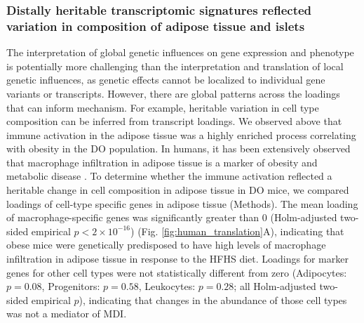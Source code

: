 \documentclass[
]{article}
\begin{document}
\subsubsection{Distally heritable transcriptomic signatures reflected
variation in composition of adipose tissue and
islets}\label{distally-heritable-transcriptomic-signatures-reflected-variation-in-composition-of-adipose-tissue-and-islets}

The interpretation of global genetic influences on gene expression and
phenotype is potentially more challenging than the interpretation and
translation of local genetic influences, as genetic effects cannot be
localized to individual gene variants or transcripts. However, there are
global patterns across the loadings that can inform mechanism. For
example, heritable variation in cell type composition can be inferred
from transcript loadings. We observed above that immune activation in
the adipose tissue was a highly enriched process correlating with
obesity in the DO population. In humans, it has been extensively
observed that macrophage infiltration in adipose tissue is a marker of
obesity and metabolic disease \cite{pmid24781408}. To determine whether
the immune activation reflected a heritable change in cell composition
in adipose tissue in DO mice, we compared loadings of cell-type specific
genes in adipose tissue (Methods). The mean loading of
macrophage-specific genes was significantly greater than 0
(Holm-adjusted two-sided empirical \(p < 2\times10^{-16}\)) (Fig.
\ref{fig:human_translation}A), indicating that obese mice were
genetically predisposed to have high levels of macrophage infiltration
in adipose tissue in response to the HFHS diet. Loadings for marker
genes for other cell types were not statistically different from zero
(Adipocytes: \(p = 0.08\), Progenitors: \(p = 0.58\), Leukocytes:
\(p = 0.28\); all Holm-adjusted two-sided empirical \(p\)), indicating
that changes in the abundance of those cell types was not a mediator of
MDI.
\end{document}
